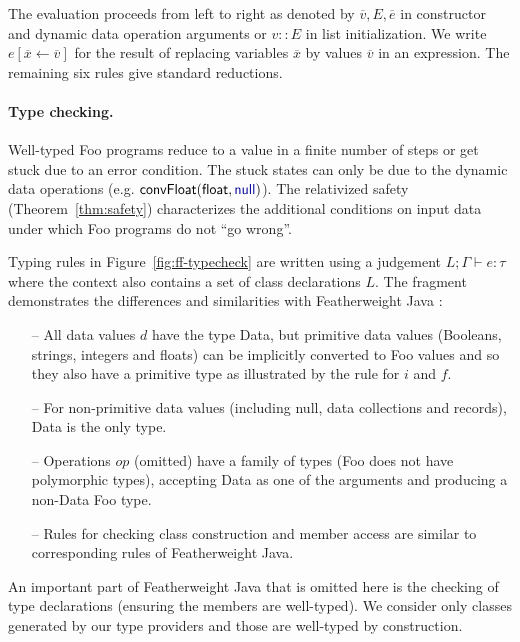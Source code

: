 \documentclass[10pt,preprint,clearpagebib]{sigplanconf}
\newcommand{\kvd}[1]{\textnormal{\textcolor{kvdclr}{\sffamily #1}}}
\newcommand{\ident}[1]{\textnormal{\sffamily #1}}
\begin{document}
\noindent
The evaluation proceeds from left to right as denoted by $\overline{v}, E, \overline{e}$ in 
constructor and dynamic data operation arguments or $v::E$ in list initialization.
We write $e[\overline{x} \leftarrow \overline{v}]$ for the result of replacing variables $\overline{x}$ by
values $\overline{v}$ in an expression. The remaining six rules
give standard reductions.


\paragraph{Type checking.} 
Well-typed Foo programs reduce to a value in a finite number of steps or get stuck due to an
error condition. The stuck states can only be due to the dynamic data operations (e.g.
$\ident{convFloat}(\ident{float},\kvd{null})$). The relativized safety (Theorem~\ref{thm:safety})
characterizes the additional conditions on input data under which Foo programs do not ``go wrong''.

Typing rules in Figure~\ref{fig:ff-typecheck} are written using a judgement
$L; \Gamma \vdash e : \tau$ where the context also contains a set of class declarations $L$.
The fragment demonstrates the differences and similarities with Featherweight Java \cite{fwjava}:
%
\begin{itemize}[noitemsep]
\item[--] All data values $d$ have the type \ident{Data}, but primitive data values (Booleans, 
  strings, integers and floats) can be implicitly converted to Foo values and so they also have a 
  primitive type as illustrated by the rule for $i$ and $f$.
\item[--] For non-primitive data values (including \kvd{null}, data collections and records),
  \ident{Data} is the only type.
\item[--] Operations $op$ (omitted) have a family of types (Foo does not have polymorphic types),
  accepting \ident{Data} as one of the arguments and producing a non-\ident{Data} Foo type.
\item[--] Rules for checking class construction and member access are similar to corresponding
  rules of Featherweight Java.  
\end{itemize}
%
An important part of Featherweight Java that is omitted here is the checking of type declarations
(ensuring the members are well-typed). We consider only classes generated by our type providers 
and those are well-typed by construction.
\end{document}
